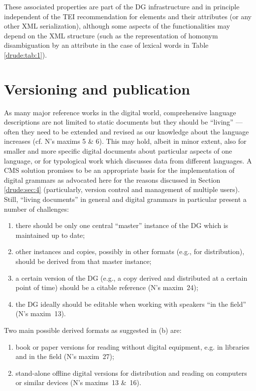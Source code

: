 These associated properties are part of the DG infrastructure and in principle independent of the TEI recommendation for elements and their attributes (or any other XML serialization), although some aspects of the functionalities may depend on the XML structure (such as the representation of homonym disambiguation by an attribute in the case of lexical words in Table \ref{drude:tab:1}).

\section{Versioning and publication} 
As many major reference works in the digital world, comprehensive language descriptions are not limited to static documents but they should be ``living'' --- often they need to be extended and revised as our knowledge about the language increases (cf. N's maxims 5 \& 6). This may hold, albeit in minor extent, also for smaller and more specific digital documents about particular aspects of one language, or for typological work which discusses data from different languages. A CMS solution promises to be an appropriate basis for the implementation of digital grammars as advocated here for the reasons discussed in Section \ref{drude:sec:4} (particularly, version control and management of multiple users). Still, ``living documents'' in general and digital grammars in particular present a number of challenges:

\begin{enumerate}
\item there should be only one central ``master'' instance of the DG which is maintained up to date;
\item other instances and copies, possibly in other formats (e.g., for distribution), should be derived from that master instance;
\item a certain version of the DG (e.g., a copy derived and distributed at a certain point of time) should be a citable reference (N's maxim~24);
\item the DG ideally should be editable when working with speakers ``in the field'' (N's maxim~13).
\end{enumerate}

Two main possible derived formats as suggested in (b) are:

\begin{enumerate}
\item book or paper versions for reading without digital equipment, e.g. in libraries and in the field (N's maxim~27);
\item stand-alone offline digital versions for distribution and reading on computers or similar devices (N's maxims~13 \&~16).
\end{enumerate}

